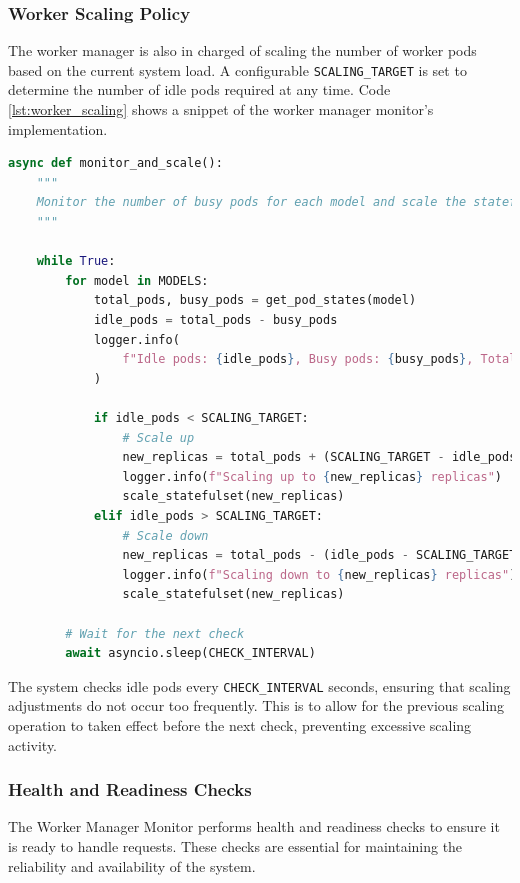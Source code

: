 \subsubsection{Worker Scaling Policy}
The worker manager is also in charged of scaling the number of worker pods based on the current system load. A configurable \texttt{SCALING\_TARGET} is set to determine the number of idle pods required at any time. Code \ref{lst:worker_scaling} shows a snippet of the worker manager monitor's implementation.

\begin{lstlisting}[language=python, caption={Worker Scaling Policy}, label={lst:worker_scaling}]
async def monitor_and_scale():
    """
    Monitor the number of busy pods for each model and scale the statefulset up or down based on the number of idle pods.
    """

    while True:
        for model in MODELS:
            total_pods, busy_pods = get_pod_states(model)
            idle_pods = total_pods - busy_pods
            logger.info(
                f"Idle pods: {idle_pods}, Busy pods: {busy_pods}, Total pods: {total_pods}"
            )

            if idle_pods < SCALING_TARGET:
                # Scale up
                new_replicas = total_pods + (SCALING_TARGET - idle_pods)
                logger.info(f"Scaling up to {new_replicas} replicas")
                scale_statefulset(new_replicas)
            elif idle_pods > SCALING_TARGET:
                # Scale down
                new_replicas = total_pods - (idle_pods - SCALING_TARGET)
                logger.info(f"Scaling down to {new_replicas} replicas")
                scale_statefulset(new_replicas)

        # Wait for the next check
        await asyncio.sleep(CHECK_INTERVAL)
\end{lstlisting}

The system checks idle pods every \texttt{CHECK\_INTERVAL} seconds, ensuring that scaling adjustments do not occur too frequently. This is to allow for the previous scaling operation to taken effect before the next check, preventing excessive scaling activity.


\subsubsection{Health and Readiness Checks}
The Worker Manager Monitor performs health and readiness checks to ensure it is ready to handle requests. These checks are essential for maintaining the reliability and availability of the system. 

